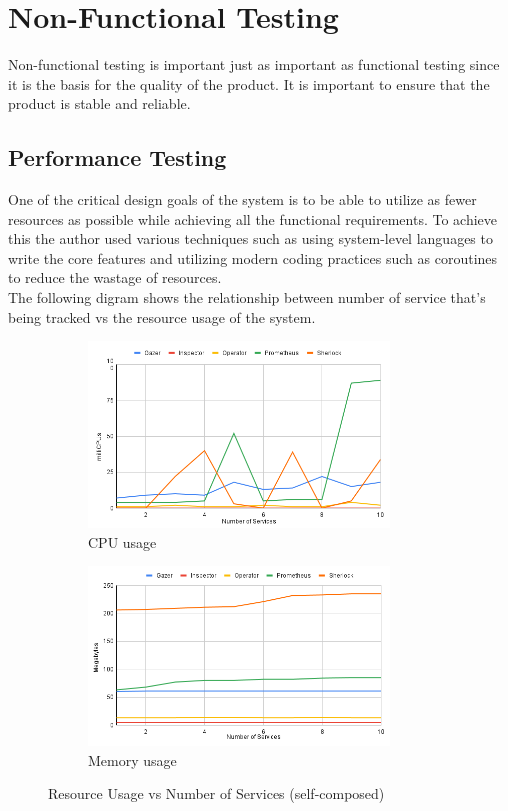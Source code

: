 \section{Non-Functional Testing}

Non-functional testing is important just as important as functional testing since it is the basis for the quality of the product. It is important to ensure that the product is stable and reliable.

\subsection{Performance Testing} \label{sec:performance-testing}

One of the critical design goals of the system is to be able to utilize as fewer resources as possible while achieving all the functional requirements. To achieve this the author used various techniques such as using system-level languages to write the core features and utilizing modern coding practices such as coroutines to reduce the wastage of resources.\\

\noindent The following digram shows the relationship between number of service that's being tracked vs the resource usage of the system.

\begin{figure}[H]
    \centering
    \begin{subfigure}[b]{0.49\textwidth}
        \centering
        \includegraphics[width=8cm]{assets/testing/cpu-usage.png}
        \caption{CPU usage}
    \end{subfigure}
    \hfill
    \begin{subfigure}[b]{0.49\textwidth}
        \centering
        \includegraphics[width=8cm]{assets/testing/memory-usage.png}
        \caption{Memory usage}
    \end{subfigure}
    \hfill
    \caption{Resource Usage vs Number of Services (self-composed)}
\end{figure}


